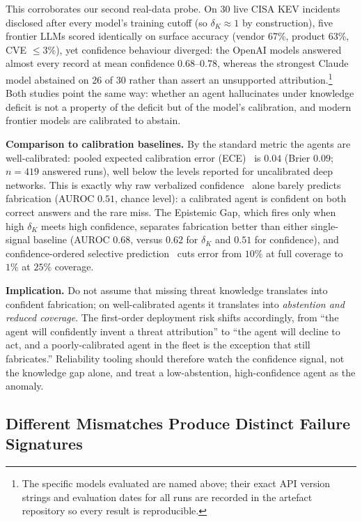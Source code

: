 \documentclass[journal,compsoc]{IEEEtran}
\begin{document}
This corroborates our second real-data probe. On 30 live CISA KEV
incidents disclosed after every model's training cutoff (so $\delta_K
\approx 1$ by construction), five frontier LLMs scored identically on
surface accuracy (vendor 67\%, product 63\%, CVE $\leq$3\%), yet
confidence behaviour diverged: the OpenAI models answered almost
every record at mean confidence 0.68--0.78, whereas the strongest
Claude model abstained on 26 of 30 rather than assert an unsupported
attribution.\footnote{The specific models evaluated are named above; their
exact API version strings and evaluation dates for all runs are recorded in
the artefact repository so every result is reproducible.} Both
studies point the same way: whether an agent hallucinates under
knowledge deficit is not a property of the deficit but of the model's
calibration, and modern frontier models are calibrated to abstain.

\textbf{Comparison to calibration baselines.} By the standard metric the
agents are well-calibrated: pooled expected calibration error
(ECE)~\cite{guo2017calibration} is $0.04$ (Brier $0.09$; $n=419$ answered
runs), well below the levels reported for uncalibrated deep networks. This
is exactly why raw verbalized confidence~\cite{tian2023calibration} alone
barely predicts fabrication (AUROC
$0.51$, chance level): a calibrated agent is confident on both correct
answers and the rare miss. The Epistemic Gap, which fires only when high
$\delta_K$ meets high confidence, separates fabrication better than either
single-signal baseline (AUROC $0.68$, versus $0.62$ for $\delta_K$ and
$0.51$ for confidence), and confidence-ordered selective
prediction~\cite{elyaniv2010selective} cuts
error from $10\%$ at full coverage to $1\%$ at $25\%$ coverage.

\textbf{Implication.} Do not assume that missing threat knowledge
translates into confident fabrication; on well-calibrated agents it
translates into \textit{abstention and reduced coverage}. The
first-order deployment risk shifts accordingly, from ``the agent will
confidently invent a threat attribution'' to ``the agent will decline
to act, and a poorly-calibrated agent in the fleet is the exception
that still fabricates.'' Reliability tooling should therefore watch the
confidence signal, not the knowledge gap alone, and treat a
low-abstention, high-confidence agent as the anomaly.

\subsection{Different Mismatches Produce Distinct Failure Signatures}
\end{document}
